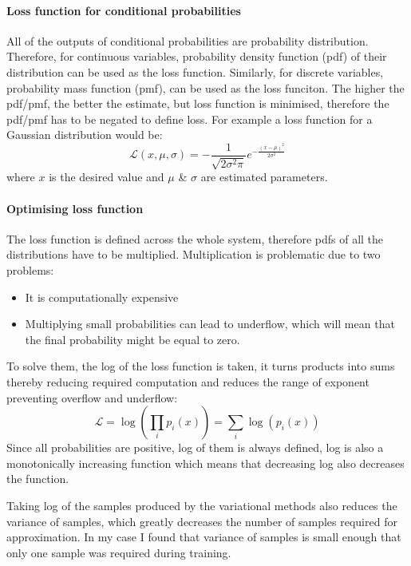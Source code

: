 \documentclass[12pt,a4paper]{book}
\begin{document}
\paragraph{Loss function for conditional probabilities}
All of the outputs of conditional probabilities are probability distribution.
Therefore, for continuous variables, probability density function (pdf) of their distribution can be used as the loss function.
Similarly, for discrete variables, probability mass function (pmf), can be used as the loss funciton.
The higher the pdf/pmf, the better the estimate, but loss function is minimised, therefore the pdf/pmf has to be negated to define loss.
For example a loss function for a Gaussian distribution would be:
\begin{equation}
\mathcal{L}(x,\mu,\sigma) = -\frac{1}{\sqrt{2\sigma^2\pi}}e^{-\frac{(x-\mu)^2}{2\sigma^2}}
\label{eq:gaussian-loss}
\end{equation}
where $x$ is the desired value and $\mu$ \& $\sigma$ are estimated parameters.

\paragraph{Optimising loss function}
The loss function is defined across the whole system, therefore  pdfs of all the distributions have to be multiplied.
Multiplication is problematic due to two problems:
\begin{itemize}
\item It is computationally expensive
\item Multiplying small probabilities can lead to underflow, which will mean that the final probability might be equal to zero.
\end{itemize}
To solve them, the log of the loss function is taken, it turns products into sums thereby reducing required computation and reduces the range of exponent preventing overflow and underflow:
\begin{equation*}
\mathcal{L} = \log\left(\prod_i p_i(x)\right) = \sum_i \log(p_i(x))
\end{equation*}
Since all probabilities are positive, log of them is always defined, log is also a monotonically increasing function which means that decreasing log also decreases the function.

Taking log of the samples produced by the variational methods also reduces the variance of samples, which greatly decreases the number of samples required for approximation.
In my case I found that variance of samples is small enough that only one sample was required during training.
\end{document}
